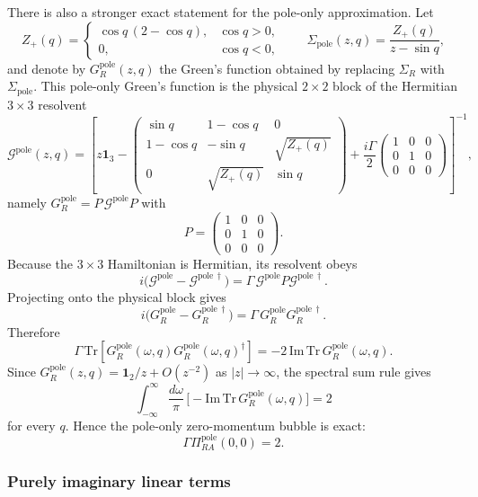 \documentclass[aps,prx,preprint,amsmath,amssymb]{revtex4-2}
\begin{document}
There is also a stronger exact statement for the pole-only approximation.  Let
\[
Z_+(q)=
\begin{cases}
\cos q\,(2-\cos q), & \cos q>0,\\
0, & \cos q<0,
\end{cases}
\qquad
\Sigma_{\mathrm{pole}}(z,q)=\frac{Z_+(q)}{z-\sin q},
\]
and denote by \(G_R^{\mathrm{pole}}(z,q)\) the Green's function obtained by
replacing \(\Sigma_R\) with \(\Sigma_{\mathrm{pole}}\).  This pole-only
Green's function is the physical \(2\times2\) block of the Hermitian
\(3\times3\) resolvent
\[
\mathcal G^{\mathrm{pole}}(z,q)
=
\left[
z\mathbf{1}_3
-
\begin{pmatrix}
\sin q & 1-\cos q & 0\\
1-\cos q & -\sin q & \sqrt{Z_+(q)}\\
0 & \sqrt{Z_+(q)} & \sin q
\end{pmatrix}
+
\frac{i\Gamma}{2}
\begin{pmatrix}
1&0&0\\
0&1&0\\
0&0&0
\end{pmatrix}
\right]^{-1},
\]
namely \(G_R^{\mathrm{pole}}=P\,\mathcal G^{\mathrm{pole}}P\) with
\[
P=
\begin{pmatrix}
1&0&0\\
0&1&0\\
0&0&0
\end{pmatrix}.
\]
Because the \(3\times3\) Hamiltonian is Hermitian, its resolvent obeys
\[
i\bigl(\mathcal G^{\mathrm{pole}}-\mathcal G^{\mathrm{pole}\,\dagger}\bigr)
=
\Gamma\,\mathcal G^{\mathrm{pole}}P\mathcal G^{\mathrm{pole}\,\dagger}.
\]
Projecting onto the physical block gives
\[
i\bigl(G_R^{\mathrm{pole}}-G_R^{\mathrm{pole}\,\dagger}\bigr)
=
\Gamma\,G_R^{\mathrm{pole}}G_R^{\mathrm{pole}\,\dagger}.
\]
Therefore
\[
\Gamma\,\mathrm{Tr}\!\left[
G_R^{\mathrm{pole}}(\omega,q)G_R^{\mathrm{pole}}(\omega,q)^\dagger
\right]
=
-2\,\mathrm{Im}\,\mathrm{Tr}\,G_R^{\mathrm{pole}}(\omega,q).
\]
Since \(G_R^{\mathrm{pole}}(z,q)=\mathbf{1}_2/z+O(z^{-2})\) as \(|z|\to\infty\),
the spectral sum rule gives
\[
\int_{-\infty}^{\infty}\frac{d\omega}{\pi}\,
\bigl[-\mathrm{Im}\,\mathrm{Tr}\,G_R^{\mathrm{pole}}(\omega,q)\bigr]=2
\]
for every \(q\).  Hence the pole-only zero-momentum bubble is exact:
\begin{equation}
\Gamma\Pi_{RA}^{\mathrm{pole}}(0,0)=2.
\end{equation}

\subsubsection{Purely imaginary linear terms}
\label{app:ra-bubble-odd-linear}
\end{document}
